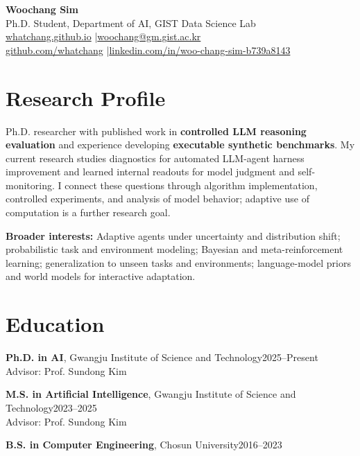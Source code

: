 \documentclass[10pt,a4paper]{article}
\begin{document}
\begin{center}
  {\LARGE\bfseries Woochang Sim}\\[3pt]
  Ph.D. Student, Department of AI, GIST Data Science Lab\\[3pt]
  \href{https://whatchang.github.io/}{whatchang.github.io}
  \enspace|\enspace\href{mailto:woochang@gm.gist.ac.kr}{woochang@gm.gist.ac.kr}\\[2pt]
  {\small\href{https://github.com/whatchang}{github.com/whatchang}
  \enspace|\enspace\href{https://www.linkedin.com/in/woo-chang-sim-b739a8143/}{linkedin.com/in/woo-chang-sim-b739a8143}}
\end{center}
\vspace{-5pt}

\section{Research Profile}
Ph.D. researcher with published work in \textbf{controlled LLM reasoning evaluation}
and experience developing \textbf{executable synthetic benchmarks}.
My current research studies diagnostics for automated LLM-agent harness improvement
and learned internal readouts for model judgment and self-monitoring.
I connect these questions through algorithm implementation, controlled experiments,
and analysis of model behavior; adaptive use of computation is a further research goal.

{\small\textbf{Broader interests:} Adaptive agents under uncertainty and distribution shift;
probabilistic task and environment modeling; Bayesian and meta-reinforcement learning;
generalization to unseen tasks and environments; language-model priors and world models
for interactive adaptation.}

\section{Education}
\textbf{Ph.D. in AI}, Gwangju Institute of Science and Technology\hfill 2025--Present\\
Advisor: Prof. Sundong Kim\par
\textbf{M.S. in Artificial Intelligence}, Gwangju Institute of Science and Technology\hfill 2023--2025\\
Advisor: Prof. Sundong Kim\par
\textbf{B.S. in Computer Engineering}, Chosun University\hfill 2016--2023
\end{document}
